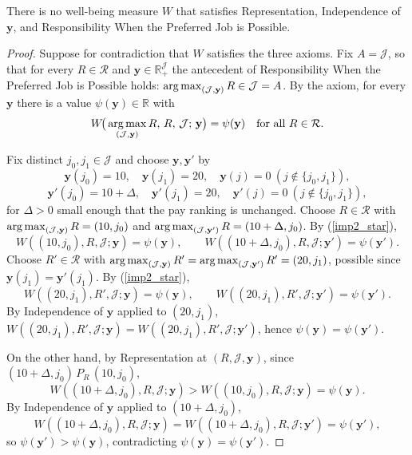 \begin{theorem}
\label{thm:imp2}
There is no well-being measure $W$ that satisfies Representation, Independence
of $\mathbf y$, and Responsibility When the Preferred Job is Possible.
\end{theorem}

\begin{proof}
Suppose for contradiction that $W$ satisfies the three axioms. Fix
$A=\mathcal J$, so that for every $R\in\mathcal R$ and $\mathbf
y\in\mathbb R_+^{\mathcal J}$ the antecedent of Responsibility When the
Preferred Job is Possible holds: $\operatorname*{arg\,max}_{(\mathcal
J,\mathbf y)}R\in\mathcal J=A$. By the axiom, for every $\mathbf y$ there is a
value $\psi(\mathbf y)\in\mathbb R$ with
\begin{equation}
W\!\big(\operatorname*{arg\,max}_{(\mathcal J,\mathbf y)}R,\,R,\,\mathcal J;\,\mathbf y\big)
=\psi(\mathbf y)\quad\text{for all }R\in\mathcal R. \label{imp2_star}
\end{equation}

Fix distinct $j_0,j_1\in\mathcal J$ and choose $\mathbf y,\mathbf y'$ by
\begin{equation*}
\mathbf y(j_0)=10,\quad \mathbf y(j_1)=20,\quad \mathbf y(j)=0\ (j\notin\{j_0,j_1\}),
\end{equation*}
\begin{equation*}
\mathbf y'(j_0)=10+\Delta,\quad \mathbf y'(j_1)=20,\quad \mathbf y'(j)=0\ (j\notin\{j_0,j_1\}),
\end{equation*}
for $\Delta>0$ small enough that the pay ranking is unchanged. Choose
$R\in\mathcal R$ with $\operatorname*{arg\,max}_{(\mathcal J,\mathbf y)}R=(10,j_0)$ and
$\operatorname*{arg\,max}_{(\mathcal J,\mathbf y')}R=(10+\Delta,j_0)$. By (\ref{imp2_star}),
\begin{equation*}
W((10,j_0),R,\mathcal J;\mathbf y)=\psi(\mathbf y),\qquad
W((10+\Delta,j_0),R,\mathcal J;\mathbf y')=\psi(\mathbf y').
\end{equation*}
Choose $R'\in\mathcal R$ with $\operatorname*{arg\,max}_{(\mathcal
J,\mathbf y)}R'=\operatorname*{arg\,max}_{(\mathcal J,\mathbf y')}R'=(20,j_1)$, possible since
$\mathbf y(j_1)=\mathbf y'(j_1)$. By (\ref{imp2_star}),
\begin{equation*}
W((20,j_1),R',\mathcal J;\mathbf y)=\psi(\mathbf y),\qquad
W((20,j_1),R',\mathcal J;\mathbf y')=\psi(\mathbf y').
\end{equation*}
By Independence of $\mathbf y$ applied to $(20,j_1)$,
$W((20,j_1),R',\mathcal J;\mathbf y)=W((20,j_1),R',\mathcal J;\mathbf y')$, hence
$\psi(\mathbf y)=\psi(\mathbf y')$.

On the other hand, by Representation at $(R,\mathcal J,\mathbf y)$, since
$(10+\Delta,j_0)\,P_R\,(10,j_0)$,
\begin{equation*}
W((10+\Delta,j_0),R,\mathcal J;\mathbf y)>W((10,j_0),R,\mathcal J;\mathbf y)
=\psi(\mathbf y).
\end{equation*}
By Independence of $\mathbf y$ applied to $(10+\Delta,j_0)$,
\begin{equation*}
W((10+\Delta,j_0),R,\mathcal J;\mathbf y)
=W((10+\Delta,j_0),R,\mathcal J;\mathbf y')=\psi(\mathbf y'),
\end{equation*}
so $\psi(\mathbf y')>\psi(\mathbf y)$, contradicting $\psi(\mathbf
y)=\psi(\mathbf y')$.
\end{proof}

